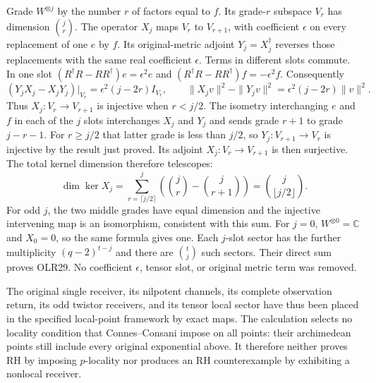 Grade $W^{\otimes j}$ by the number $r$ of factors equal to $f$.
Its grade-$r$ subspace $V_r$ has dimension $\binom jr$.
The operator $X_j$ maps $V_r$ to $V_{r+1}$, with coefficient
$\epsilon$ on every replacement of one $e$ by $f$.
Its original-metric adjoint $Y_j=X_j^\dagger$ reverses those
replacements with the same real coefficient $\epsilon$.
Terms in different slots commute. In one slot
$(R^\dagger R-RR^\dagger)e=\epsilon^2e$ and
$(R^\dagger R-RR^\dagger)f=-\epsilon^2f$.
Consequently
\[
(Y_jX_j-X_jY_j)|_{V_r}=\epsilon^2(j-2r)I_{V_r},\qquad
\|X_jv\|^2-\|Y_jv\|^2
=\epsilon^2(j-2r)\|v\|^2.
\tag{OLR30}
\]
Thus $X_j:V_r\to V_{r+1}$ is injective when $r<j/2$.
The isometry interchanging $e$ and $f$ in each of the $j$ slots
interchanges $X_j$ and $Y_j$ and sends grade $r+1$ to grade
$j-r-1$. For $r\ge j/2$ that latter grade is less than $j/2$,
so $Y_j:V_{r+1}\to V_r$ is injective by the result just proved.
Its adjoint $X_j:V_r\to V_{r+1}$ is then surjective.
The total kernel dimension therefore telescopes:
\[
\dim\ker X_j
=\sum_{r=\lceil j/2\rceil}^j
      \left(\binom jr-\binom j{r+1}\right)
=\binom j{\lfloor j/2\rfloor}.
\tag{OLR31}
\]
For odd $j$, the two middle grades have equal dimension and the
injective intervening map is an isomorphism, consistent with this
sum. For $j=0$, $W^{\otimes0}=\mathbb C$ and $X_0=0$, so the
same formula gives one. Each $j$-slot sector has the further
multiplicity $(q-2)^{t-j}$ and there are $\binom tj$ such sectors.
Their direct sum proves OLR29. No coefficient $\epsilon$, tensor
slot, or original metric term was removed.

The original single receiver, its nilpotent channels, its complete
observation return, its odd twistor receivers, and its tensor
local sector have thus been placed in the specified local-point
framework by exact maps. The calculation selects no locality
condition that Connes--Consani impose on all points: their
archimedean points still include every original exponential above.
It therefore neither proves RH by imposing $p$-locality nor
produces an RH counterexample by exhibiting a nonlocal receiver.
